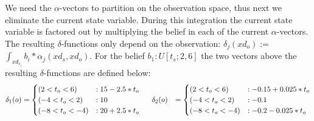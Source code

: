 \documentclass{article} %
\begin{document}
We need the $\alpha$-vectors to partition on the observation space, thus next we eliminate the current state variable. During this integration the current state variable is factored out by multiplying the belief in each of the current $\alpha$-vectors.  The resulting $\delta$-functions only depend on the observation: $\delta_{j}(xd_o) := $ $\int_{xd_{s_i}} b_i * \alpha_j(xd_s,xd_o)$.
For the belief $b_1: U[t_s;2,6]$ the two vectors above the resulting $\delta$-functions are defined below: 
{\footnotesize
\begin{align}
\delta_{1}(o) &= 
\begin{cases}
 (2<t_o<6) &: 15 - 2.5*t_o \\
(-4<t_o<2) &: 10 \\
(-8<t_o<-4) &: 20 + 2.5*t_o 
\end{cases}
\hspace{5mm} 
\delta_{2}(o) &= \begin{cases}
 (2<t_o<6) &: -0.15 + 0.025*t_o \\
(-4<t_o<2) &: -0.1 \\
(-8<t_o<-4) &: -0.2 - 0.025*t_o 
\end{cases}
\nonumber
\end{align}
}
\end{document}
